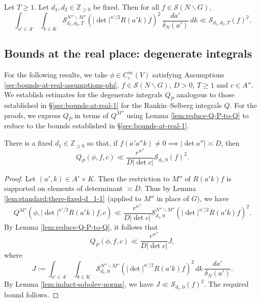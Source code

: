 \begin{corollary}\label{cor:standard:induct-sobolev-norms}
  Let $T \geq 1$.  Let $d_1, d_2 \in \mathbb{Z}_{\geq 0}$ be fixed.  Then for all $f \in \mathcal{S}(N \backslash G)$,
  \begin{equation*}
    \int_{a' \in A'}
    \int_{k \in K}
    \mathcal{S} _{d_1, d_2,T} ^{N'' \backslash M''}
    \left(
      |\det|^{n'/2}
      R(a' k) f
    \right)^2
    \, \frac{d a '}{\delta_N(a')} \, d k
    \ll
    \mathcal{S}_{d_1,d_2,T}(f)^2.
  \end{equation*}
\end{corollary}

\subsection{Bounds at the real place: degenerate integrals}\label{sec:bounds-at-real-2}
For the following results, we take $\phi \in C_c^\infty(V)$ satisfying Assumptions \ref{sec:bounds-at-real-assumptions-phi}, $f \in \mathcal{S}(N \backslash G)$, $D > 0$, $T \geq 1$ and $c \in A''$.  We establish estimates for the degenerate integrals $Q_P$ analogous to those established in \S\ref{sec:bounds-at-real-1} for the Rankin--Selberg integrals $Q$.  For the proofs, we express $Q_P$ in terms of $Q^{M''}$ using Lemma \ref{lem:reduce-Q-P-to-Q} to reduce to the bounds established in \S\ref{sec:bounds-at-real-1}.


\begin{lemma}\label{lem:sub-gln:there-fixed-x-3}
  There is a fixed $d_1 \in \mathbb{Z}_{\geq 0}$ so that, if $f(a' a'' k) \neq 0 \implies |\det a''| \asymp D$, then
  \begin{equation*}
    Q_P(\phi,f,c) \ll \frac{r^{n''}}{D |\det c|} \mathcal{S}_{d_1,0}(f)^2.
  \end{equation*}
\end{lemma}
\begin{proof}
  Let $(a', k) \in A' \times K$.  Then the restriction to $M''$ of $R(a' k) f$ is supported on elements of determinant $\asymp D$.  Thus by Lemma \ref{lem:standard:there-fixed-d_1-1} (applied to $M''$ in place of $G$), we have
  \begin{equation*}
    Q^{M''}(\phi, |\det|^{n'/2 }R(a' k) f, c)
    \ll
    \frac{r^{n''}}{D |\det c|}
    \mathcal{S}_{d_1,0}^{N'' \backslash M''}\left(|\det |^{n'/2} R(a' k) f\right)^2.
  \end{equation*}
  By Lemma \ref{lem:reduce-Q-P-to-Q}, it follows that
  \begin{equation*}
    Q_P(\phi, f, c) \ll \frac{r^{n''}}{D |\det c|} J,
  \end{equation*}
  where
  \begin{equation*}
    J :=
    \int_{a ' \in A'}
    \int_{k \in K}
    \mathcal{S}_{d_1,0}^{N'' \backslash M''}\left(|\det|^{n'/2} R(a' k) f\right)^2
    \, d k
    \, \frac{d a '}{\delta_N(a')}.
  \end{equation*}
  By Lemma \ref{lem:induct-sobolev-norms}, we have $J \ll \mathcal{S}_{d_1,0}(f)^2$.  The required bound follows.
\end{proof}

